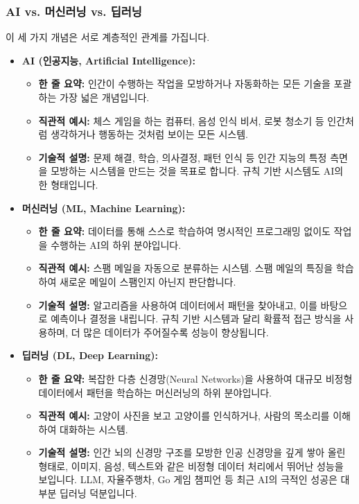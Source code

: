\documentclass[11pt,a4paper]{article}
\begin{document}
\subsubsection*{AI vs. 머신러닝 vs. 딥러닝}
이 세 가지 개념은 서로 계층적인 관계를 가집니다.
\begin{itemize}
    \item \textbf{AI (인공지능, Artificial Intelligence):}
    \begin{itemize}
        \item \textbf{한 줄 요약:} 인간이 수행하는 작업을 모방하거나 자동화하는 모든 기술을 포괄하는 가장 넓은 개념입니다.
        \item \textbf{직관적 예시:} 체스 게임을 하는 컴퓨터, 음성 인식 비서, 로봇 청소기 등 인간처럼 생각하거나 행동하는 것처럼 보이는 모든 시스템.
        \item \textbf{기술적 설명:} 문제 해결, 학습, 의사결정, 패턴 인식 등 인간 지능의 특정 측면을 모방하는 시스템을 만드는 것을 목표로 합니다. 규칙 기반 시스템도 AI의 한 형태입니다.
    \end{itemize}
    \item \textbf{머신러닝 (ML, Machine Learning):}
    \begin{itemize}
        \item \textbf{한 줄 요약:} 데이터를 통해 스스로 학습하여 명시적인 프로그래밍 없이도 작업을 수행하는 AI의 하위 분야입니다.
        \item \textbf{직관적 예시:} 스팸 메일을 자동으로 분류하는 시스템. 스팸 메일의 특징을 학습하여 새로운 메일이 스팸인지 아닌지 판단합니다.
        \item \textbf{기술적 설명:} 알고리즘을 사용하여 데이터에서 패턴을 찾아내고, 이를 바탕으로 예측이나 결정을 내립니다. 규칙 기반 시스템과 달리 확률적 접근 방식을 사용하며, 더 많은 데이터가 주어질수록 성능이 향상됩니다.
    \end{itemize}
    \item \textbf{딥러닝 (DL, Deep Learning):}
    \begin{itemize}
        \item \textbf{한 줄 요약:} 복잡한 다층 신경망(Neural Networks)을 사용하여 대규모 비정형 데이터에서 패턴을 학습하는 머신러닝의 하위 분야입니다.
        \item \textbf{직관적 예시:} 고양이 사진을 보고 고양이를 인식하거나, 사람의 목소리를 이해하여 대화하는 시스템.
        \item \textbf{기술적 설명:} 인간 뇌의 신경망 구조를 모방한 인공 신경망을 깊게 쌓아 올린 형태로, 이미지, 음성, 텍스트와 같은 비정형 데이터 처리에서 뛰어난 성능을 보입니다. LLM, 자율주행차, Go 게임 챔피언 등 최근 AI의 극적인 성공은 대부분 딥러닝 덕분입니다.
    \end{itemize}
\end{itemize}
\end{document}
